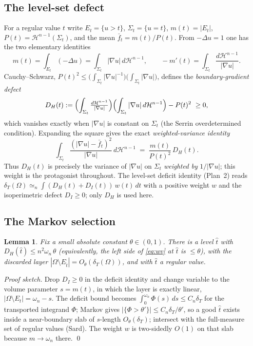 \documentclass[11pt]{amsart}
\newtheorem{lemma}[theorem]{Lemma}
\theoremstyle{definition}
\theoremstyle{remark}
\newcommand{\Om}{\Omega}
\newcommand{\dT}{\delta_T}
\newcommand{\Sg}{\Sigma}
\newcommand{\fbar}{\bar f}
\newcommand{\Hn}{\mathcal H^{n-1}}
\begin{document}
\subsection{The level-set defect}
For a regular value $t$ write $E_t=\{u>t\}$, $\Sg_t=\{u=t\}$,
$m(t)=|E_t|$, $P(t)=\Hn(\Sg_t)$, and the mean
$\fbar_t=m(t)/P(t)$. From $-\Delta u=1$ one has the two elementary
identities
\[
  m(t)=\int_{E_t}(-\Delta u)=\int_{\Sg_t}|\nabla u|\,d\Hn,
  \qquad
  -m'(t)=\int_{\Sg_t}\frac{d\Hn}{|\nabla u|}.
\]
Cauchy--Schwarz, $P(t)^2\le\bigl(\int_{\Sg_t}|\nabla u|^{-1}\bigr)
\bigl(\int_{\Sg_t}|\nabla u|\bigr)$, defines the
\emph{boundary-gradient defect}
\[
  D_H(t):=\Bigl(\int_{\Sg_t}\tfrac{d\Hn}{|\nabla u|}\Bigr)
          \Bigl(\int_{\Sg_t}|\nabla u|\,d\Hn\Bigr)-P(t)^2\ \ge0,
\]
which vanishes exactly when $|\nabla u|$ is constant on $\Sg_t$ (the
Serrin overdetermined condition). Expanding the square gives the exact
\emph{weighted-variance identity}
\begin{equation}\label{eq:wv}
  \int_{\Sg_t}\frac{(|\nabla u|-\fbar_t)^2}{|\nabla u|}\,d\Hn
  \;=\;\frac{m(t)}{P(t)^2}\,D_H(t).
\end{equation}
Thus $D_H(t)$ is precisely the variance of $|\nabla u|$ on $\Sg_t$
\emph{weighted by} $1/|\nabla u|$; this weight is the protagonist
throughout. The level-set deficit identity (Plan~2) reads
$\dT(\Om)\simeq_n\int (D_H(t)+D_I(t))\,w(t)\,dt$ with a positive weight
$w$ and the isoperimetric defect $D_I\ge0$; only $D_H$ is used here.

\subsection{The Markov selection}
\begin{lemma}\label{lem:markov}
Fix a small absolute constant $\theta\in(0,1)$. There is a level
$\hat t$ with $D_H(\hat t)\le n^2\omega_n\,\theta$ (equivalently, the
left side of \eqref{eq:wv} at $\hat t$ is $\le\theta$), with the
discarded layer $|\Om\setminus E_{\hat t}|=O_\theta(\dT(\Om))$, and
with $\hat t$ a regular value.
\end{lemma}
\begin{proof}[Proof sketch]
Drop $D_I\ge0$ in the deficit identity and change variable to the
volume parameter $s=m(t)$, in which the layer is exactly linear,
$|\Om\setminus E_t|=\omega_n-s$. The deficit bound becomes
$\int_0^{\omega_n}\Phi(s)\,ds\le C_n\dT$ for the transported integrand
$\Phi$; Markov gives $|\{\Phi>\theta'\}|\le C_n\dT/\theta'$, so a good
$\hat t$ exists inside a near-boundary slab of $s$-length
$O_\theta(\dT)$; intersect with the full-measure set of regular values
(Sard). The weight $w$ is two-sidedly $O(1)$ on that slab because
$m\to\omega_n$ there. \qed
\end{proof}
\end{document}

